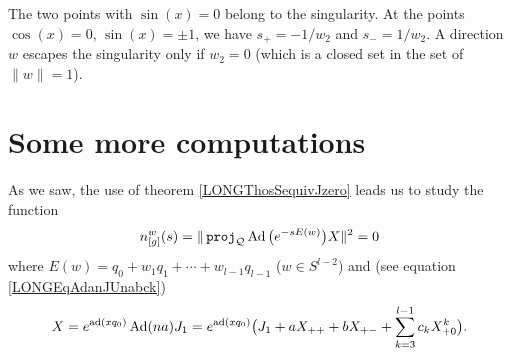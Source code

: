 The two points with $\sin(x)=0$ belong to the singularity. At the points $\cos(x)=0$, $\sin(x)=\pm1$, we have $s_+=-1/w_2$ and $s_-=1/w_2$. A direction $w$ escapes the singularity only if $w_2=0$ (which is a closed set in the set of $\| w \|=1$). 


\newcommand{\CaptionFigSFdgHdO}{Points in $\pi(K)$ are classified by their angle in $\SO(2)$. Red points are part of the singularity, points in the black zone belong to the black hole and points in the green zone are free. The upper and lower boundaries belong to the horizon.}



%
\section{Some more computations}
%
\label{LONGSecMoreComputations}

As we saw, the use of theorem \ref{LONGThosSequivJzero} leads us to study the function
\begin{equation}			\label{LONGEqprSqbignor}
	n_{[g]}^w(s)=\|   \operatorname{\texttt{proj}}_{\mathcal{Q}} \operatorname{Ad}\big(  e^{-s E(w)} \big)X  \|^2=0
\end{equation}
where $E(w)=q_0+w_1q_1+\cdots+w_{l-1}q_{l-1}$ ($w\in S^{l-2}$) and (see equation \eqref{LONGEqAdanJUnabck})
\begin{equation}
	X=e^{\operatorname{ad}(xq_0)}\operatorname{Ad}(na)J_1=e^{\operatorname{ad}(xq_0)}\big(  J_1+aX_{++}+bX_{+-}+\sum_{k=3}^{l-1}c_kX_{+0}^k\big).
\end{equation}


